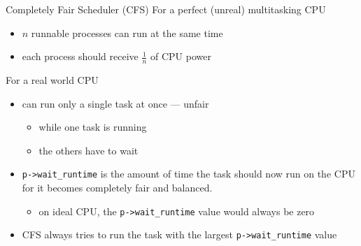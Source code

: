 
\begin{frame}{Completely Fair Scheduler (CFS)}
  For a perfect (unreal) multitasking CPU
  \begin{itemize}
  \item $n$ runnable processes can run at the same time
  \item each process should receive $\frac{1}{n}$ of CPU power
  \end{itemize}
  
  For a real world CPU
  \begin{itemize}
  \item can run only a single task at once --- unfair
    \begin{itemize}
    \item[🙂] while one task is running
    \item[\textcolor{red}{🙁}] the others have to wait
    \end{itemize}
  \item \texttt{p->wait\_runtime} is the amount of time the task should now run on the CPU
    for it becomes completely fair and balanced.
    \begin{itemize}
    \item[🙂] on ideal CPU, the \texttt{p->wait\_runtime} value would always be zero
    \end{itemize}
  \item CFS always tries to run the task with the largest \texttt{p->wait\_runtime} value
  \end{itemize}
\end{frame}

